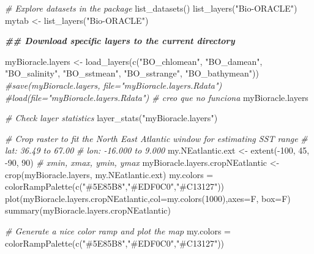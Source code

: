 \documentclass[
]{book}
\newenvironment{Shaded}{\begin{snugshade}}{\end{snugshade}}
\newcommand{\AttributeTok}[1]{\textcolor[rgb]{0.77,0.63,0.00}{#1}}
\newcommand{\CommentTok}[1]{\textcolor[rgb]{0.56,0.35,0.01}{\textit{#1}}}
\newcommand{\DecValTok}[1]{\textcolor[rgb]{0.00,0.00,0.81}{#1}}
\newcommand{\DocumentationTok}[1]{\textcolor[rgb]{0.56,0.35,0.01}{\textbf{\textit{#1}}}}
\newcommand{\FunctionTok}[1]{\textcolor[rgb]{0.00,0.00,0.00}{#1}}
\newcommand{\NormalTok}[1]{#1}
\newcommand{\OtherTok}[1]{\textcolor[rgb]{0.56,0.35,0.01}{#1}}
\newcommand{\SpecialCharTok}[1]{\textcolor[rgb]{0.00,0.00,0.00}{#1}}
\newcommand{\StringTok}[1]{\textcolor[rgb]{0.31,0.60,0.02}{#1}}
\begin{document}
\begin{Shaded}
\begin{Highlighting}[]
\CommentTok{\# Explore datasets in the package }
\FunctionTok{list\_datasets}\NormalTok{()}
\FunctionTok{list\_layers}\NormalTok{(}\StringTok{"Bio{-}ORACLE"}\NormalTok{)}
\NormalTok{mytab }\OtherTok{\textless{}{-}} \FunctionTok{list\_layers}\NormalTok{(}\StringTok{"Bio{-}ORACLE"}\NormalTok{)}

\DocumentationTok{\#\# Download specific layers to the current directory }

\NormalTok{myBioracle.layers }\OtherTok{\textless{}{-}} \FunctionTok{load\_layers}\NormalTok{(}\FunctionTok{c}\NormalTok{(}\StringTok{"BO\_chlomean"}\NormalTok{, }\StringTok{"BO\_damean"}\NormalTok{, }\StringTok{"BO\_salinity"}\NormalTok{, }\StringTok{"BO\_sstmean"}\NormalTok{, }\StringTok{"BO\_sstrange"}\NormalTok{, }\StringTok{"BO\_bathymean"}\NormalTok{)) }
\CommentTok{\#save(myBioracle.layers, file="myBioracle.layers.Rdata")}
\CommentTok{\#load(file="myBioracle.layers.Rdata") \# creo que no funciona}
\NormalTok{myBioracle.layers}

\CommentTok{\# Check layer statistics }
\FunctionTok{layer\_stats}\NormalTok{(}\StringTok{"myBioracle.layers"}\NormalTok{) }

\CommentTok{\# Crop raster to fit the North East Atlantic window for estimating SST range}
\CommentTok{\# lat: 36.49 to 67.00  }
\CommentTok{\# lon: {-}16.000 to 9.000}
\NormalTok{my.NEatlantic.ext }\OtherTok{\textless{}{-}} \FunctionTok{extent}\NormalTok{(}\SpecialCharTok{{-}}\DecValTok{100}\NormalTok{, }\DecValTok{45}\NormalTok{, }\SpecialCharTok{{-}}\DecValTok{90}\NormalTok{, }\DecValTok{90}\NormalTok{) }\CommentTok{\# xmin, xmax, ymin, ymax}
\NormalTok{myBioracle.layers.cropNEatlantic }\OtherTok{\textless{}{-}} \FunctionTok{crop}\NormalTok{(myBioracle.layers, my.NEatlantic.ext) }
\NormalTok{my.colors }\OtherTok{=} \FunctionTok{colorRampPalette}\NormalTok{(}\FunctionTok{c}\NormalTok{(}\StringTok{"\#5E85B8"}\NormalTok{,}\StringTok{"\#EDF0C0"}\NormalTok{,}\StringTok{"\#C13127"}\NormalTok{)) }
\FunctionTok{plot}\NormalTok{(myBioracle.layers.cropNEatlantic,}\AttributeTok{col=}\FunctionTok{my.colors}\NormalTok{(}\DecValTok{1000}\NormalTok{),}\AttributeTok{axes=}\NormalTok{F, }\AttributeTok{box=}\NormalTok{F)}
\FunctionTok{summary}\NormalTok{(myBioracle.layers.cropNEatlantic)}

\CommentTok{\# Generate a nice color ramp and plot the map }
\NormalTok{my.colors }\OtherTok{=} \FunctionTok{colorRampPalette}\NormalTok{(}\FunctionTok{c}\NormalTok{(}\StringTok{"\#5E85B8"}\NormalTok{,}\StringTok{"\#EDF0C0"}\NormalTok{,}\StringTok{"\#C13127"}\NormalTok{)) }


\end{Highlighting}
\end{Shaded}
\end{document}
